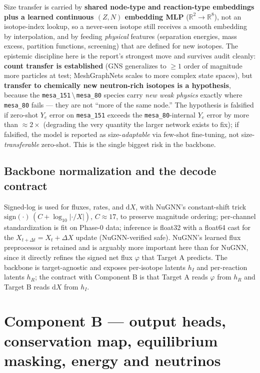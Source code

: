 \documentclass[11pt]{article}
\newcommand{\msn}[1]{\texttt{mesa\_#1}}
\newcommand{\Ye}{Y_{e}}
\newcommand{\dd}{\mathrm{d}}
\begin{document}
Size transfer is carried by \textbf{shared node-type and reaction-type embeddings plus a learned continuous $(Z,N)$ embedding MLP} ($\mathbb{R}^{2}\!\to\!\mathbb{R}^{8}$), not an isotope-index lookup, so a never-seen isotope still receives a smooth embedding by interpolation, and by feeding \emph{physical} features (separation energies, mass excess, partition functions, screening) that are defined for new isotopes. The epistemic discipline here is the report's strongest move and survives audit cleanly: \textbf{count transfer is established} (GNS generalizes to $\ge 1$ order of magnitude more particles at test; MeshGraphNets scales to more complex state spaces), but \textbf{transfer to chemically new neutron-rich isotopes is a hypothesis}, because the \msn{151}$\,\setminus\,$\msn{80} species carry \emph{new weak physics} exactly where \msn{80} fails --- they are not ``more of the same node.'' The hypothesis is falsified if zero-shot $\Ye$ error on \msn{151} exceeds the \msn{80}-internal $\Ye$ error by more than $\approx 2\times$ (degrading the very quantity the larger network exists to fix); if falsified, the model is reported as size-\emph{adaptable} via few-shot fine-tuning, not size-\emph{transferable} zero-shot. This is the single biggest risk in the backbone.

\subsection{Backbone normalization and the decode contract}

Signed-log is used for fluxes, rates, and $\dd X$, with NuGNN's constant-shift trick $\mathrm{sign}(\cdot)\,(C + \log_{10}|\cdot/X|)$, $C \approx 17$, to preserve magnitude ordering; per-channel standardization is fit on Phase-0 data; inference is float32 with a float64 cast for the $X_{t+\Delta t} = X_t + \Delta X$ update (NuGNN-verified safe). NuGNN's learned flux preprocessor is retained and is arguably more important here than for NuGNN, since it directly refines the signed net flux $\varphi$ that Target A predicts. The backbone is target-agnostic and exposes per-isotope latents $h_I$ and per-reaction latents $h_R$; the contract with Component B is that Target A reads $\varphi$ from $h_R$ and Target B reads $\dd X$ from $h_I$.

\section{Component B --- output heads, conservation map, equilibrium masking, energy and neutrinos}
\end{document}
